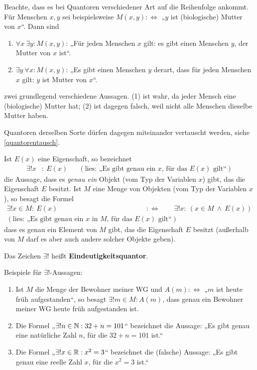  
\begin{bem} \label{quantorreihenfolge}
    Beachte, dass es bei Quantoren verschiedener Art auf die Reihenfolge ankommt. Für Menschen $x,y$ sei beispielsweise $M(x,y):\Leftrightarrow$ „$y$ ist (biologische) Mutter von $x$“. Dann sind
    \begin{enumerate}[(1)]
        \item $\forall x\ \exists y: M(x,y)$: „Für jeden Menschen $x$ gilt: es gibt einen Menschen $y$, der Mutter von $x$ ist“.
        \item $\exists y\ \forall x: M(x,y)$: „Es gibt einen Menschen $y$ derart, dass für jeden Menschen $x$ gilt: $y$ ist Mutter von $x$“.
    \end{enumerate}
    zwei grundlegend verschiedene Aussagen. (1) ist wahr, da jeder Mensch eine (biologische) Mutter hat; (2) ist dagegen falsch, weil nicht alle Menschen dieselbe Mutter haben.
    
    Quantoren derselben Sorte dürfen dagegen miteinander vertauscht werden, siehe \cref{quantorentausch}.
\end{bem}


\begin{defin} \label{def:eindquant}
    Ist $E(x)$ eine Eigenschaft, so bezeichnet
    \begin{align*}
        \exists ! x& :\ E(x) && (\text{lies: „Es gibt genau ein $x$, für das $E(x)$ gilt“})
    \end{align*}
    die Aussage, dass es \emph{genau ein} Objekt (vom Typ der Variablen $x$) gibt, das die Eigenschaft $E$ besitzt. Ist $M$ eine Menge von Objekten (vom Typ der Variablen $x$), so besagt die Formel
    \begin{align*}
        \exists ! x\in M :\ E(x) \qquad &:\Leftrightarrow\qquad \exists ! x:\ (x\in M\ \land\ E(x)) \\
        (\text{lies: „Es gibt genau ein $x$ in $M$, für das $E(x)$ gilt“})
    \end{align*}
    dass es genau ein Element von $M$ gibt, das die Eigenschaft $E$ besitzt (außerhalb von $M$ darf es aber auch andere solcher Objekte geben).
    
    Das Zeichen $\exists !$ heißt \textbf{Eindeutigkeitsquantor}.
\end{defin}


\begin{bsp}
    Beispiele für $\exists !$-Aussagen:
    \begin{enumerate}
        \item Ist $M$ die Menge der Bewohner meiner WG und $A(m):\Leftrightarrow$ „$m$ ist heute früh aufgestanden“, so besagt $\exists ! m\in M: A(m)$, dass genau ein Bewohner meiner WG heute früh aufgestanden ist.
        \item Die Formel „$\exists ! n\in \mathbb N : 32+n = 101$“ bezeichnet die Aussage: „Es gibt genau eine natürliche Zahl $n$, für die $32+n=101$ ist.“
        \item Die Formel „$\exists ! x\in \mathbb R: x^2=3$“ bezeichnet die (falsche) Aussage: „Es gibt genau eine reelle Zahl $x$, für die $x^2=3$ ist.“
    \end{enumerate}
\end{bsp}


